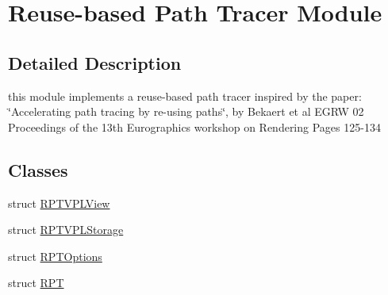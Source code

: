 \hypertarget{group___r_p_t_module}{}\section{Reuse-\/based Path Tracer Module}
\label{group___r_p_t_module}


\subsection{Detailed Description}
this module implements a reuse-\/based path tracer inspired by the paper\+: \char`\"{}\+Accelerating path tracing by re-\/using paths\char`\"{}, by Bekaert et al E\+G\+RW \textquotesingle{}02 Proceedings of the 13th Eurographics workshop on Rendering Pages 125-\/134 \subsection*{Classes}
\begin{DoxyCompactItemize}
\item 
struct \hyperlink{struct_r_p_t_v_p_l_view}{R\+P\+T\+V\+P\+L\+View}
\item 
struct \hyperlink{struct_r_p_t_v_p_l_storage}{R\+P\+T\+V\+P\+L\+Storage}
\item 
struct \hyperlink{struct_r_p_t_options}{R\+P\+T\+Options}
\item 
struct \hyperlink{struct_r_p_t}{R\+PT}
\end{DoxyCompactItemize}
